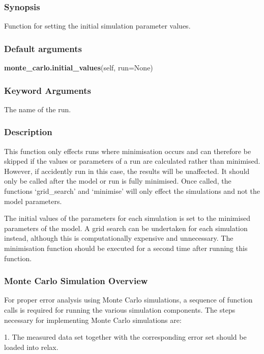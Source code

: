 \subsubsection{Synopsis}

Function for setting the initial simulation parameter values.

\subsubsection{Default arguments}

\textsf{\textbf{monte\_carlo.initial\_values}(self, run=None)}


\subsubsection{Keyword Arguments}

  The name of the run.

\subsubsection{Description}

This function only effects runs where minimisation occurs and can therefore be skipped if
the values or parameters of a run are calculated rather than minimised.  However, if
accidently run in this case, the results will be unaffected.  It should only be called after
the model or run is fully minimised.  Once called, the functions `grid\_search' and
`minimise' will only effect the simulations and not the model parameters.

The initial values of the parameters for each simulation is set to the minimised parameters
of the model.  A grid search can be undertaken for each simulation instead, although this
is computationally expensive and unnecessary.  The minimisation function should be executed
for a second time after running this function.



\subsubsection{Monte Carlo Simulation Overview}

For proper error analysis using Monte Carlo simulations, a sequence of function calls is
required for running the various simulation components.  The steps necessary for
implementing Monte Carlo simulations are:

1.  The measured data set together with the corresponding error set should be loaded into
relax.

